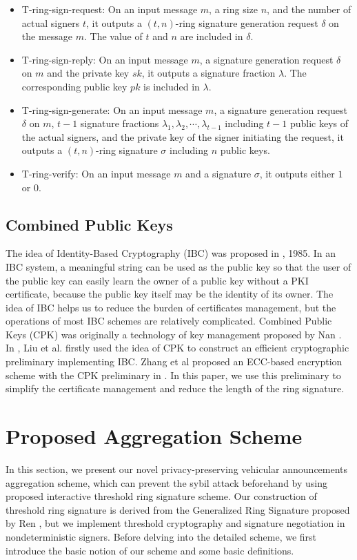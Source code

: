 \documentclass[a4paper]{article}
\begin{document}
\begin{itemize}
 \item T-ring-sign-request: On an input message $m$, a ring size $n$, and the number of actual signers $t$, it outputs a $(t,n)$-ring signature generation request $\delta$ on the message $m$. The value of $t$ and $n$ are included in $\delta$.
 \item T-ring-sign-reply: On an input message $m$, a signature generation request $\delta$ on $m$ and the private key $sk$, it outputs a signature fraction $\lambda$. The corresponding public key $pk$ is included in $\lambda$.
 \item T-ring-sign-generate: On an input message $m$, a signature generation request $\delta$ on $m$, $t-1$ signature fractions $\lambda_1, \lambda_2, \cdots, \lambda_{t-1}$ including $t-1$ public keys of the actual signers, and the private key of the signer initiating the request, it outputs a $(t,n)$-ring signature $\sigma$ including $n$ public keys.
 \item T-ring-verify: On an input message $m$ and a signature $\sigma$, it outputs either $1$ or $0$.
\end{itemize}

\subsection{Combined Public Keys}
The idea of Identity-Based Cryptography (IBC) was proposed in \cite{Sha85}, 1985. In an IBC system, a meaningful string can be used as the public key so that the user of the public key can easily learn the owner of a public key without a PKI certificate, because the public key itself may be the identity of its owner. The idea of IBC helps us to reduce the burden of certificates management, but the operations of most IBC schemes are relatively complicated. Combined Public Keys (CPK) was originally a technology of key management proposed by Nan \cite{Nan06}. In \cite{LZ08}, Liu et al. firstly used the idea of CPK to construct an efficient cryptographic preliminary implementing IBC. Zhang et al proposed an ECC-based encryption scheme with the CPK preliminary in \cite{ZLH10}. In this paper, we use this preliminary to simplify the certificate management and reduce the length of the ring signature.
\section{Proposed Aggregation Scheme}
In this section, we present our novel privacy-preserving vehicular announcements aggregation scheme, which can prevent the sybil attack beforehand by using proposed interactive threshold ring signature scheme. Our construction of threshold ring signature is derived from the Generalized Ring Signature proposed by Ren \cite{RH08}, but we implement threshold cryptography and signature negotiation in nondeterministic signers. Before delving into the detailed scheme, we first introduce the basic notion of our scheme and some basic definitions.
\end{document}
